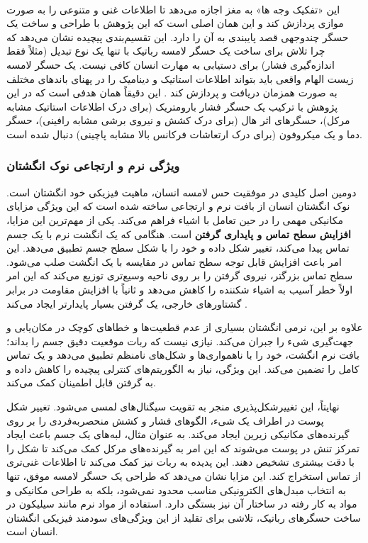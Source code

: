 \\
این «تفکیک وجه ها» به مغز اجازه می‌دهد تا اطلاعات غنی و متنوعی را به صورت موازی پردازش کند و این همان اصلی است که این پژوهش با طراحی و ساخت یک حسگر چندوجهی
قصد پایبندی به آن را دارد.
این تقسیم‌بندی پیچیده نشان می‌دهد که چرا تلاش برای ساخت یک حسگر لامسه رباتیک با تنها یک نوع تبدیل (مثلاً فقط اندازه‌گیری فشار) برای دستیابی به مهارت انسان کافی نیست. یک حسگر لامسه زیست الهام
 واقعی باید بتواند اطلاعات استاتیک و دینامیک را در پهنای باندهای مختلف به صورت همزمان دریافت و پردازش کند
 \cite{silvera2015artificial}.
  این دقیقاً همان هدفی است که در این پژوهش با ترکیب یک حسگر فشار بارومتریک (برای درک اطلاعات استاتیک مشابه مرکل)، حسگرهای اثر هال (برای درک کشش و نیروی برشی مشابه رافینی)، حسگر دما و یک میکروفون (برای درک ارتعاشات فرکانس بالا مشابه پاچینی) دنبال شده است.


\subsubsection{ویژگی نرم و ارتجاعی نوک انگشتان}

دومین اصل کلیدی در موفقیت حس لامسه انسان، ماهیت فیزیکی خود انگشتان است. نوک انگشتان انسان از بافت نرم و ارتجاعی ساخته شده است که این ویژگی مزایای مکانیکی مهمی را در حین تعامل با اشیاء فراهم می‌کند.
یکی از مهم‌ترین این مزایا، \textbf{افزایش سطح تماس و پایداری گرفتن} است. هنگامی که یک انگشت نرم با یک جسم تماس پیدا می‌کند، تغییر شکل داده و خود را با شکل سطح جسم تطبیق می‌دهد. این امر باعث افزایش قابل توجه سطح تماس در مقایسه با یک انگشت صلب می‌شود. سطح تماس بزرگتر، نیروی گرفتن را بر روی ناحیه وسیع‌تری توزیع می‌کند که این امر اولاً خطر آسیب به اشیاء شکننده را کاهش می‌دهد و ثانیاً با افزایش مقاومت در برابر گشتاورهای خارجی، یک گرفتن بسیار پایدارتر ایجاد می‌کند
 \cite{yousef2011tactile}.

علاوه بر این، نرمی انگشتان بسیاری از عدم قطعیت‌ها و خطاهای کوچک در مکان‌یابی و جهت‌گیری شیء را جبران می‌کند. نیازی نیست که ربات موقعیت دقیق جسم را بداند؛ بافت نرم انگشت، خود را با ناهمواری‌ها و شکل‌های نامنظم تطبیق می‌دهد و یک تماس کامل را تضمین می‌کند. این ویژگی، نیاز به الگوریتم‌های کنترلی پیچیده را کاهش داده و به گرفتن قابل اطمینان کمک می‌کند.

نهایتاً، این تغییرشکل‌پذیری منجر به تقویت سیگنال‌های لمسی می‌شود. تغییر شکل پوست در اطراف یک شیء، الگوهای فشار و کشش منحصربه‌فردی را بر روی گیرنده‌های مکانیکی زیرین ایجاد می‌کند. به عنوان مثال، لبه‌های یک جسم باعث ایجاد تمرکز تنش در پوست می‌شوند که این امر به گیرنده‌های مرکل کمک می‌کند تا شکل را با دقت بیشتری تشخیص دهند. این پدیده به ربات نیز کمک می‌کند تا اطلاعات غنی‌تری از تماس استخراج کند.
\cite{silvera2015artificial}
این مزایا نشان می‌دهد که طراحی یک حسگر لامسه موفق، تنها به انتخاب مبدل‌های الکترونیکی مناسب محدود نمی‌شود، بلکه به طراحی مکانیکی و مواد به کار رفته در ساختار آن نیز بستگی دارد. استفاده از مواد نرم مانند سیلیکون در ساخت حسگرهای رباتیک، تلاشی برای تقلید از این ویژگی‌های سودمند فیزیکی انگشتان انسان است.

